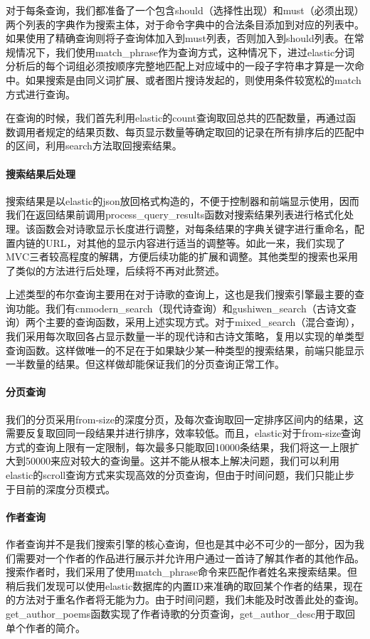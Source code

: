 \documentclass[a4paper, 10pt]{article}
\begin{document}
对于每条查询，我们都准备了一个包含should（选择性出现）和must（必须出现）两个列表的字典作为搜索主体，对于命令字典中的合法条目添加到对应的列表中。如果使用了精确查询则将子查询体加入到must列表，否则加入到should列表。在常规情况下，我们使用match\_phrase作为查询方式，这种情况下，进过elastic分词分析后的每个词组必须按顺序完整地匹配上对应域中的一段子字符串才算是一次命中。如果搜索是由同义词扩展、或者图片搜诗发起的，则使用条件较宽松的match方式进行查询。

在查询的时候，我们首先利用elastic的count查询取回总共的匹配数量，再通过函数调用者规定的结果页数、每页显示数量等确定取回的记录在所有排序后的匹配中的区间，利用search方法取回搜索结果。

\paragraph*{搜索结果后处理} 搜索结果是以elastic的json放回格式构造的，不便于控制器和前端显示使用，因而我们在返回结果前调用process\_query\_results函数对搜索结果列表进行格式化处理。该函数会对诗歌显示长度进行调整，对每条结果的字典关键字进行重命名，配置内链的URL，对其他的显示内容进行适当的调整等。如此一来，我们实现了MVC三者较高程度的解耦，方便后续功能的扩展和调整。其他类型的搜索也采用了类似的方法进行后处理，后续将不再对此赘述。

上述类型的布尔查询主要用在对于诗歌的查询上，这也是我们搜索引擎最主要的查询功能。我们有cnmodern\_search（现代诗查询）和gushiwen\_search（古诗文查询）两个主要的查询函数，采用上述实现方式。对于mixed\_search（混合查询），我们采用每次取回各占显示数量一半的现代诗和古诗文策略，复用以实现的单类型查询函数。这样做唯一的不足在于如果缺少某一种类型的搜索结果，前端只能显示一半数量的结果。但这样做却能保证我们的分页查询正常工作。

\paragraph*{分页查询} 我们的分页采用from-size的深度分页，及每次查询取回一定排序区间内的结果，这需要反复取回同一段结果并进行排序，效率较低。而且，elastic对于from-size查询方式的查询上限有一定限制，每次最多只能取回10000条结果，我们将这一上限扩大到50000来应对较大的查询量。这并不能从根本上解决问题，我们可以利用elastic的scroll查询方式来实现高效的分页查询，但由于时间问题，我们只能止步于目前的深度分页模式。

\paragraph*{作者查询} 作者查询并不是我们搜索引擎的核心查询，但也是其中必不可少的一部分，因为我们需要对一个作者的作品进行展示并允许用户通过一首诗了解其作者的其他作品。搜索作者时，我们采用了使用match\_phrase命令来匹配作者姓名来搜索结果。但稍后我们发现可以使用elastic数据库的内置ID来准确的取回某个作者的结果，现在的方法对于重名作者将无能为力。由于时间问题，我们未能及时改善此处的查询。get\_author\_poems函数实现了作者诗歌的分页查询，get\_author\_desc用于取回单个作者的简介。
\end{document}
